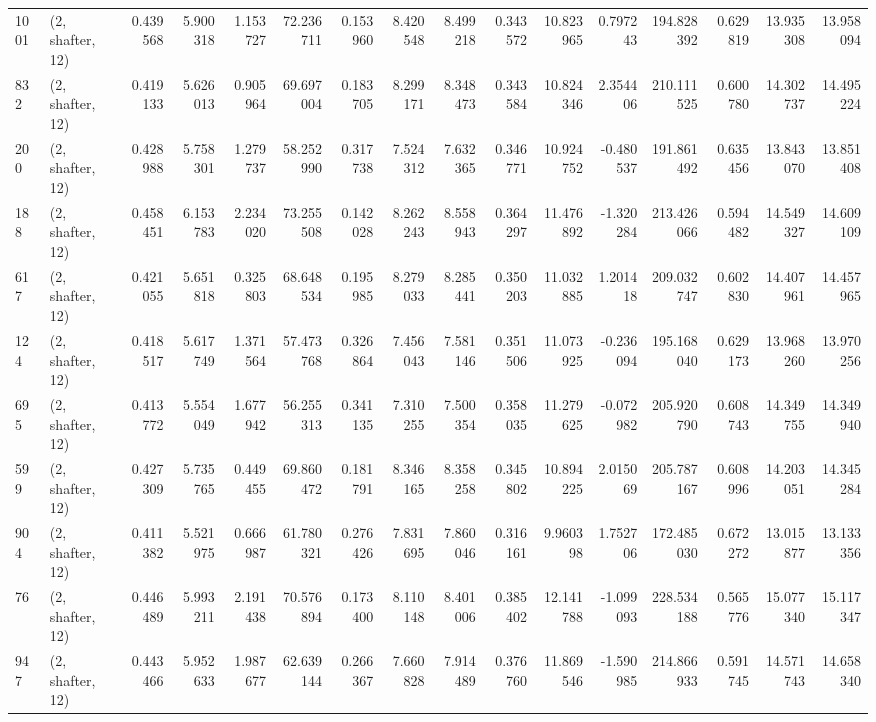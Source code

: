 \begin{tabular}{llrrrrrrrrrrrrrr}
1001 &  (2, shafter, 12) &   0.439568 &   5.900318 &   1.153727 &     72.236711 &    0.153960 &    8.420548 &    8.499218 &  0.343572 &  10.823965 &   0.797243 &   194.828392 &   0.629819 &  13.935308 &  13.958094 \\
832  &  (2, shafter, 12) &   0.419133 &   5.626013 &   0.905964 &     69.697004 &    0.183705 &    8.299171 &    8.348473 &  0.343584 &  10.824346 &   2.354406 &   210.111525 &   0.600780 &  14.302737 &  14.495224 \\
200  &  (2, shafter, 12) &   0.428988 &   5.758301 &   1.279737 &     58.252990 &    0.317738 &    7.524312 &    7.632365 &  0.346771 &  10.924752 &  -0.480537 &   191.861492 &   0.635456 &  13.843070 &  13.851408 \\
188  &  (2, shafter, 12) &   0.458451 &   6.153783 &   2.234020 &     73.255508 &    0.142028 &    8.262243 &    8.558943 &  0.364297 &  11.476892 &  -1.320284 &   213.426066 &   0.594482 &  14.549327 &  14.609109 \\
617  &  (2, shafter, 12) &   0.421055 &   5.651818 &   0.325803 &     68.648534 &    0.195985 &    8.279033 &    8.285441 &  0.350203 &  11.032885 &   1.201418 &   209.032747 &   0.602830 &  14.407961 &  14.457965 \\
124  &  (2, shafter, 12) &   0.418517 &   5.617749 &   1.371564 &     57.473768 &    0.326864 &    7.456043 &    7.581146 &  0.351506 &  11.073925 &  -0.236094 &   195.168040 &   0.629173 &  13.968260 &  13.970256 \\
695  &  (2, shafter, 12) &   0.413772 &   5.554049 &   1.677942 &     56.255313 &    0.341135 &    7.310255 &    7.500354 &  0.358035 &  11.279625 &  -0.072982 &   205.920790 &   0.608743 &  14.349755 &  14.349940 \\
599  &  (2, shafter, 12) &   0.427309 &   5.735765 &   0.449455 &     69.860472 &    0.181791 &    8.346165 &    8.358258 &  0.345802 &  10.894225 &   2.015069 &   205.787167 &   0.608996 &  14.203051 &  14.345284 \\
904  &  (2, shafter, 12) &   0.411382 &   5.521975 &   0.666987 &     61.780321 &    0.276426 &    7.831695 &    7.860046 &  0.316161 &   9.960398 &   1.752706 &   172.485030 &   0.672272 &  13.015877 &  13.133356 \\
76   &  (2, shafter, 12) &   0.446489 &   5.993211 &   2.191438 &     70.576894 &    0.173400 &    8.110148 &    8.401006 &  0.385402 &  12.141788 &  -1.099093 &   228.534188 &   0.565776 &  15.077340 &  15.117347 \\
947  &  (2, shafter, 12) &   0.443466 &   5.952633 &   1.987677 &     62.639144 &    0.266367 &    7.660828 &    7.914489 &  0.376760 &  11.869546 &  -1.590985 &   214.866933 &   0.591745 &  14.571743 &  14.658340 \\

\end{tabular}
